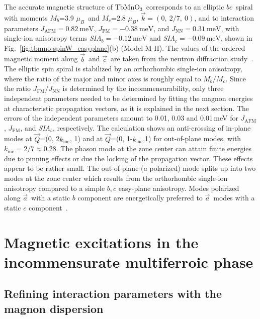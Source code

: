 \documentclass[aps,prb,twocolumn,superscriptaddress,showpacs,floatfix]{revtex4-2}
\newcommand{\tbmno}{TbMnO$_3$}
\newcommand{\aaxis}{$\vec{a}$}
\newcommand{\baxis}{$\vec{b}$}
\newcommand{\caxis}{$\vec{c}$}
\newcommand{\bcplane}{$bc$}
\newcommand{\mubohr}{\,$\mu_B$}
\begin{document}
The accurate magnetic structure of \tbmno\ corresponds to an elliptic \bcplane\ spiral with moments $M_b$=3.9\,\mubohr\ and $M_c$=2.8\,\mubohr , $\vec{k}=(0,~2/7,~0)$, and to interaction parameters $J_{\textrm{AFM}}=\SI{0.82}{\meV}$, $J_{\textrm{FM}}=\SI{-0.38}{\meV}$, and $J_{\textrm{NN}}=\SI{0.31}{\meV}$, with single-ion anisotropy terms \textit{SIA}$_b=\SI{-0.12}{\meV}$ and \textit{SIA}$_c=\SI{-0.09}{\meV}$, shown in Fig.~\ref{fig:tbmno-spinW_easyplane}(b) (Model M-II).
The values of the ordered magnetic moment along \baxis\ and \caxis\ are taken from the neutron diffraction study~\cite{Kenzelmann2005}.
The elliptic spin spiral is stabilized by an orthorhombic single-ion anisotropy, where the ratio of the major and minor axes is roughly equal to $M_b/M_c$.
Since the ratio $J_{\textrm{FM}}$/$J_{\textrm{NN}}$ is determined by the incommensurability, only three independent parameters needed to be
determined by fitting the magnon energies at characteristic propagation vectors, as it is explained in the next section.
The errors of the independent parameters amount to 0.01, 0.03 and 0.01\,meV for $J_{\textrm{AFM}}$,  $J_{\textrm{FM}}$, and \textit{SIA}$_b$, respectively.
The calculation shows an anti-crossing of in-plane modes  at  $\vec{Q}$=(0, 2$k_{\textrm{inc}}$, 1) and at $\vec{Q}$=(0, 1-$k_{\textrm{inc}}$,1) for out-of-plane modes, with $k_{\textrm{inc}}=2/7\approx 0.28$.
The phason mode at the zone center can attain finite energies due to pinning effects or due the locking of the propagation vector.
These effects appear to be rather small.
The out-of-plane ($a$ polarized) mode splits up into two modes at the zone center which results from the orthorhombic single-ion anisotropy compared to a simple
$b,c$ easy-plane anisotropy.
Modes polarized along \aaxis\ with a static $b$ component are energetically preferred to \aaxis \ modes with a static $c$ component~\cite{note-incom}.





\section{Magnetic excitations in the incommensurate multiferroic phase}

\subsection{Refining interaction parameters with the magnon dispersion}
\end{document}
